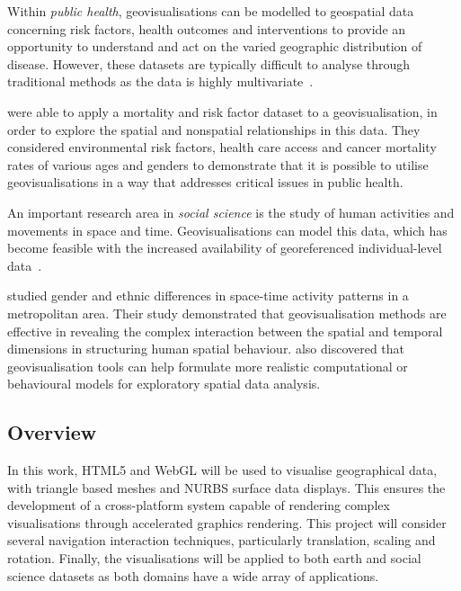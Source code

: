 {	%
	Within \emph{public health}, geovisualisations can be modelled to geospatial data concerning risk factors, health outcomes and interventions to provide an opportunity to understand and act on the varied geographic distribution of disease. However, these datasets are typically difficult to analyse through traditional methods as the data is highly multivariate~\parencite{maceachren2004geovisualization}.

	\textcite{maceachren2004geovisualization} were able to apply a mortality and risk factor dataset to a geovisualisation, in order to explore the spatial and nonspatial relationships in this data. They considered environmental risk factors, health care access and cancer mortality rates of various ages and genders to demonstrate that it is possible to utilise geovisualisations in a way that addresses critical issues in public health.

	An important research area in \emph{social science} is the study of human activities and movements in space and time. Geovisualisations can model this data, which has become feasible with the increased availability of georeferenced individual-level data~\parencite{kwan2004geovisualization}.

	\textcite{kwan2004geovisualization} studied gender and ethnic differences in space-time activity patterns in a metropolitan area. Their study demonstrated that geovisualisation methods are effective in revealing the complex interaction between the spatial and temporal dimensions in structuring human spatial behaviour. \citeauthor{kwan2004geovisualization} also discovered that geovisualisation tools can help formulate more realistic computational or behavioural models for exploratory spatial data analysis.

}

\subsection{Overview} {

	In this work, HTML5 and WebGL will be used to visualise geographical data, with triangle based meshes and NURBS surface data displays. This ensures the development of a cross-platform system capable of rendering complex visualisations through accelerated graphics rendering. This project will consider several navigation interaction techniques, particularly translation, scaling and rotation. Finally, the visualisations will be applied to both earth and social science datasets as both domains have a wide array of applications.

}
